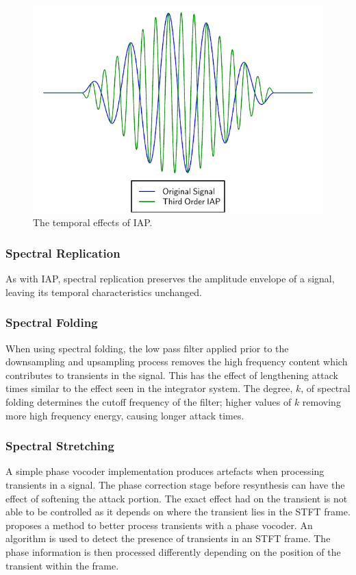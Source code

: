 			\begin{figure}[h!]
				\centering
				\includegraphics{chapter5/Images/IAPTemporalEffects.pdf}
				\caption{The temporal effects of IAP.}
				\label{fig:IAPTemporalEffects}
			\end{figure}
			
		\subsubsection*{Spectral Replication}
			As with IAP, spectral replication preserves the amplitude envelope of a signal, leaving its
			temporal characteristics unchanged.

		\subsubsection*{Spectral Folding}
			When using spectral folding, the low pass filter applied prior to the downsampling and upsampling
			process removes the high frequency content which contributes to transients in the signal. This has
			the effect of lengthening attack times similar to the effect seen in the integrator system. The
			degree, $k$, of spectral folding determines the cutoff frequency of the filter; higher values of
			$k$ removing more high frequency energy, causing longer attack times.

		\subsubsection*{Spectral Stretching}
			A simple phase vocoder implementation produces artefacts when processing transients in a signal.
			The phase correction stage before resynthesis can have the effect of softening the attack portion.
			The exact effect had on the transient is not able to be controlled as it depends on where the
			transient lies in the STFT frame. \citet{robel2003a} proposes a method to better process transients
			with a phase vocoder. An algorithm is used to detect the presence of transients in an STFT frame.
			The phase information is then processed differently depending on the position of the transient
			within the frame.

